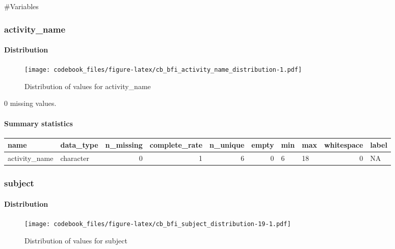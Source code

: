 \documentclass[
]{article}
\begin{document}
\#Variables

\hypertarget{activity_name}{%
\subsubsection{activity\_name}\label{activity_name}}

\hypertarget{activity_name_distribution}{%
\paragraph{Distribution}\label{activity_name_distribution}}

\begin{figure}
\centering
\texttt{[image: codebook\_files/figure-latex/cb\_bfi\_activity\_name\_distribution-1.pdf]}
\caption{Distribution of values for activity\_name}
\end{figure}

0 missing values.

\hypertarget{activity_name_summary}{%
\paragraph{Summary statistics}\label{activity_name_summary}}

\begin{longtable}[]{@{}llrrrrllrl@{}}
\toprule
name & data\_type & n\_missing & complete\_rate & n\_unique & empty &
min & max & whitespace & label \\
\midrule
\endhead
activity\_name & character & 0 & 1 & 6 & 0 & 6 & 18 & 0 & NA \\
\bottomrule
\end{longtable}

\hypertarget{subject}{%
\subsubsection{subject}\label{subject}}

\hypertarget{subject_distribution}{%
\paragraph{Distribution}\label{subject_distribution}}

\begin{figure}
\centering
\texttt{[image: codebook\_files/figure-latex/cb\_bfi\_subject\_distribution-19-1.pdf]}
\caption{Distribution of values for subject}
\end{figure}
\end{document}
